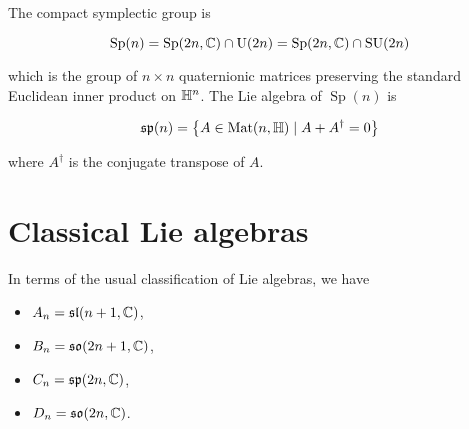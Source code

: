 \documentclass{article}
\renewcommand{\sl}{\mfs\mfl}
\DeclareMathOperator{\SU}{SU}
\newcommand{\rU}{\mathrm{U}}
\newcommand{\so}{\mfs\mfo}
\DeclareMathOperator{\Sp}{Sp}
\renewcommand{\sp}{\mfs\mfp}
\begin{document}
The compact symplectic group is

\[\Sp(n) = \Sp(2n, \C) \cap \rU(2n) = \Sp(2n, \C) \cap \SU(2n)\]

which is the group of \(n \times n\) quaternionic matrices preserving the standard Euclidean inner product on \(\mathbb{H}^n\). The Lie algebra of \(\Sp(n)\) is

\[\sp(n) = \left\{A \in \Mat(n, \bb H) \mid A + A^\dagger = 0\right\}\]

where \(A^\dagger\) is the conjugate transpose of \(A\).

\section{Classical Lie algebras}

In terms of the usual classification of Lie algebras, we have

\begin{itemize}
    \item \(A_n = \sl(n + 1, \C)\),
    \item \(B_n = \so(2n + 1, \C)\),
    \item \(C_n = \sp(2n, \C)\),
    \item \(D_n = \so(2n, \C)\).
\end{itemize}
\end{document}
